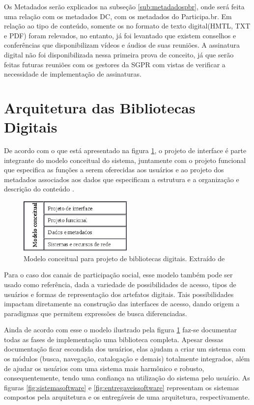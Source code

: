 Os Metadados serão explicados na subseção \ref{sub:metadadospbr}, onde será feita uma relação com os metadados DC, com os metadados do Participa.br. Em relação ao tipo de conteúdo, somente os no formato de texto digital(HMTL, TXT e PDF) foram relevados, no entanto, já foi levantado que existem conselhos e conferências que disponibilizam vídeos e áudios de suas reuniões. A assinatura digital não foi disponibilizada nessa primeira prova de conceito, já que serão feitas futuras reuniões com os gestores da SGPR com vistas de verificar a necessidade de implementação de assinaturas.

\section{Arquitetura das Bibliotecas Digitais}

De acordo com o que está apresentado na figura \ref{fig:modelbibdigital}, o projeto de interface é parte integrante do modelo conceitual do sistema, juntamente com o projeto funcional que especifica as funções a serem oferecidas aos usuários e ao projeto dos metadados associados aos dados que especificam a estrutura e a organização e descrição do conteúdo \cite[pp. 143--145]{arms2000digital}\cite[pp. 190]{ferreira2006interface}.

\graphicspath{{figuras/}}
\begin{figure}[H]
\centering
\includegraphics[width=0.5\textwidth]{modelo_biblioteca}
\caption[Modelo conceitual para projeto de bibliotecas digitais]{Modelo conceitual para projeto de bibliotecas digitais. Extraído de \cite[p. 144]{arms2000digital}}
\label{fig:modelbibdigital}
\end{figure}

Para o caso dos canais de participação social, esse modelo também pode ser usado como referência, dada a variedade de possibilidades de acesso, tipos de usuários e formas de representação dos artefatos digitais. Tais possibilidades impactam diretamente na construção das interfaces de acesso, dando origem a paradigmas que permitem expressões de busca diferenciadas.

Ainda de acordo com esse o modelo ilustrado pela figura \ref{fig:modelbibdigital} faz-se documentar todas as fases de implementação uma biblioteca completa. Apesar dessas documentação ficar escondida dos usuários, elas ajudam a criar um sistema com os módulos (busca, navegação, catalogação e demais) totalmente integrados, além de ajudar os usuários com uma sistema mais harmônico e robusto, consequentemente, tendo uma confiança na utilização do sistema pelo usuário. As figuras \ref{fig:sistemasoftware}  e \ref{fig:entregaveissoftware} representam os sistemas compostos pela arquitetura e os entregáveis de uma arquitetura, respectivamente.

